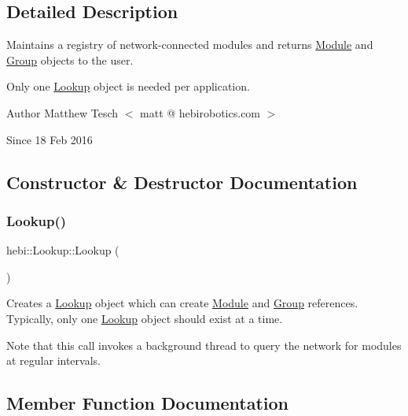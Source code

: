 \subsection{Detailed Description}
Maintains a registry of network-\/connected modules and returns \hyperlink{classhebi_1_1Module}{Module} and \hyperlink{classhebi_1_1Group}{Group} objects to the user. 

Only one \hyperlink{classhebi_1_1Lookup}{Lookup} object is needed per application.

\begin{DoxyAuthor}{Author}
Matthew Tesch $<$ matt @ hebirobotics.\+com $>$ 
\end{DoxyAuthor}
\begin{DoxySince}{Since}
18 Feb 2016 
\end{DoxySince}


\subsection{Constructor \& Destructor Documentation}
\mbox{\label{classhebi_1_1Lookup_acdfa87d652dd197ff578e5ea0f25128c}} 
\subsubsection{\texorpdfstring{Lookup()}{Lookup()}}
{\footnotesize\ttfamily hebi\+::\+Lookup\+::\+Lookup (\begin{DoxyParamCaption}{ }\end{DoxyParamCaption})}



Creates a \hyperlink{classhebi_1_1Lookup}{Lookup} object which can create \hyperlink{classhebi_1_1Module}{Module} and \hyperlink{classhebi_1_1Group}{Group} references. Typically, only one \hyperlink{classhebi_1_1Lookup}{Lookup} object should exist at a time. 

Note that this call invokes a background thread to query the network for modules at regular intervals. 

\subsection{Member Function Documentation}
\mbox{\label{classhebi_1_1Lookup_ad77bc157e336ee526157d5b31eb6bc22}} 
